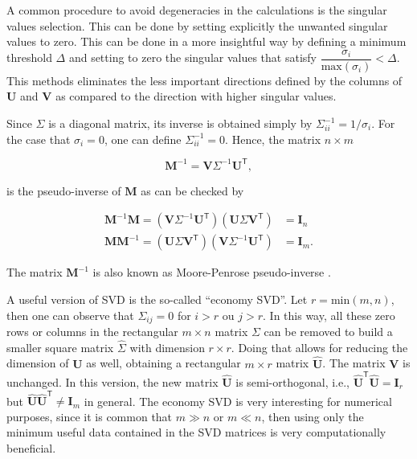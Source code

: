 A common procedure to avoid degeneracies in the calculations is the singular values selection. This can be done by setting explicitly the unwanted singular values to zero. This can be done in a more insightful way by defining a minimum threshold $\Delta$ and setting to zero the singular values that satisfy $\dfrac{\sigma_i}{\mathrm{max}\left(\sigma_i\right)} < \Delta$. This methods eliminates the less important directions defined by the columns of $\mathbf{U}$ and $\mathbf{V}$ as compared to the direction with higher singular values. 

Since $\Sigma$ is a diagonal matrix, its inverse is obtained simply by $\Sigma^{-1}_{ii} = 1/\sigma_{i}$. For the case that $\sigma_{i} = 0$, one can define $\Sigma^{-1}_{ii} = 0$. Hence, the matrix $n \times m$

\begin{equation}
    \mathbf{M}^{-1} = \mathbf{V} \Sigma^{-1} \mathbf{U}^{\mathsf{T}},
    \label{eq:svd_inverse}
\end{equation}

is the pseudo-inverse of $\mathbf{M}$ as can be checked by

\begin{align}
    \mathbf{M}^{-1}\mathbf{M} =  \left(\mathbf{V} \Sigma^{-1} \mathbf{U}^{\mathsf{T}} \right)\left(\mathbf{U} \Sigma \mathbf{V}^{\mathsf{T}}\right) &= \mathbf{I}_{n} \\
    \mathbf{M}\mathbf{M}^{-1} =  \left(\mathbf{U} \Sigma \mathbf{V}^{\mathsf{T}}\right)\left( \mathbf{V} \Sigma^{-1} \mathbf{U}^{\mathsf{T}} \right)&= \mathbf{I}_{m}. 
\end{align}

The matrix $\mathbf{M}^{-1}$ is also known as Moore-Penrose pseudo-inverse \cite{numerical_recipes}.

A useful version of SVD is the so-called ``economy SVD''. Let $r = \mathrm{min}\left(m, n\right)$, then one can observe that $\Sigma_{ij} = 0$ for $i > r$ ou $j > r$. In this way, all these zero rows or columns in the rectangular $m \times n$ matrix $\Sigma$ can be removed to build a smaller square matrix $\hat{\Sigma}$ with dimension $r \times r$. Doing that allows for reducing the dimension of $\mathbf{U}$ as well, obtaining a rectangular $m \times r$ matrix $\hat{\mathbf{U}}$. The matrix $\mathbf{V}$ is unchanged. In this version, the new matrix $\hat{\mathbf{U}}$ is semi-orthogonal, i.e., $\hat{\mathbf{U}}^{\mathsf{T}}\hat{\mathbf{U}} = \mathbf{I}_r$ but $\hat{\mathbf{U}}\hat{\mathbf{U}}^{\mathsf{T}} \neq \mathbf{I}_m$ in general. The economy SVD is very interesting for numerical purposes, since it is common that $m \gg n$ or $m \ll n$, then using only the minimum useful data contained in the SVD matrices is very computationally beneficial.

